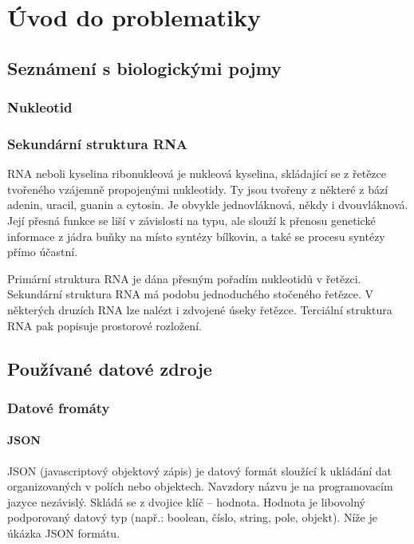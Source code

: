 
\chapter{Úvod do problematiky}

\section {Seznámení s biologickými pojmy}

\subsection{Nukleotid}

\subsection{Sekundární struktura RNA}
  RNA neboli kyselina ribonukleová je nukleová kyselina, skládající se z
  řetězce tvořeného vzájemně propojenými nukleotidy. Ty jsou tvořeny z některé
  z bází adenin, uracil, guanin a cytosin. Je obvykle jednovláknová, někdy i
  dvouvláknová. Její přesná funkce se liší v závislosti na typu, ale slouží k
  přenosu genetické informace z jádra buňky na místo syntézy bílkovin, a také
  se procesu syntézy přímo účastní.

  Primární struktura RNA je dána přesným pořadím nukleotidů v řetězci.
  Sekundární struktura RNA má podobu jednoduchého stočeného řetězce. V
  některých druzích RNA lze nalézt i zdvojené úseky řetězce. Terciální
  struktura RNA pak popisuje prostorové rozložení.

\section {Používané datové zdroje}

\subsection{Datové fromáty}

\subsubsection*{JSON}
  JSON (javascriptový objektový zápis) je datový formát sloužící k ukládání dat
  organizovaných v polích nebo objektech. Navzdory názvu je na programovacím
  jazyce nezávislý. Skládá se z dvojice klíč -- hodnota. Hodnota je libovolný
  podporovaný datový typ (např.: boolean, číslo, string, pole, objekt). Níže je
  úkázka JSON formátu.

